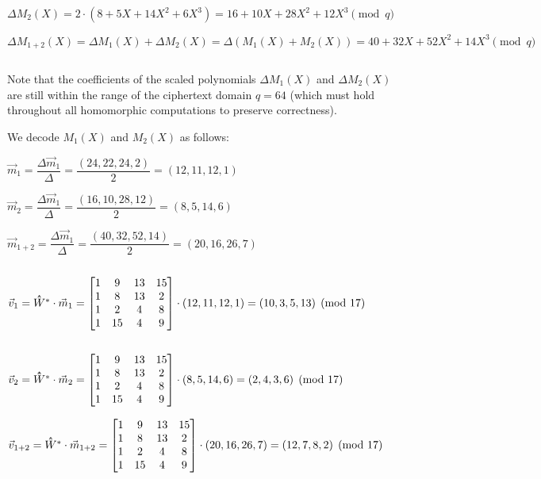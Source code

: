 $\Delta M_2(X) = 2\cdot(8 + 5X + 14X^2 + 6X^3) = 16 + 10X + 28X^2 + 12X^3 \pmod{q}$

$\Delta M_{1+2}(X) = \Delta M_1(X) + \Delta M_2(X) = \Delta (M_1(X) + M_2(X)) = 40 + 32X + 52X^2 + 14X^3 \pmod{q}$

$ $

Note that the coefficients of the scaled polynomials $\Delta M_1(X)$ and $\Delta M_2(X)$ are still within the range of the ciphertext domain $q=64$ (which must hold throughout all homomorphic computations to preserve correctness). 

We decode $M_1(X)$ and $M_2(X)$ as follows: 

$\vec{m}_1 = \dfrac{\Delta \vec{m}_1}{\Delta} = \dfrac{(24, 22, 24, 2)}{2} = (12, 11, 12, 1)$

$\vec{m}_2 = \dfrac{\Delta \vec{m}_1}{\Delta} = \dfrac{(16, 10, 28, 12)}{2} = (8, 5, 14, 6)$

$\vec{m}_{1+2} = \dfrac{\Delta \vec{m}_1}{\Delta} = \dfrac{(40, 32, 52, 14)}{2} = (20, 16, 26, 7)$

$ $


$\vec{v}_1 = \hathat{W}^* \cdot \vec{m}_1 = \begin{bmatrix}
1 & 9 & 13 & 15\\
1 & 8 & 13 & 2\\
1 & 2 & 4 & 8\\
1 & 15 & 4 & 9\\
\end{bmatrix} \cdot (12, 11, 12, 1) = (10, 3, 5, 13) \pmod{17}$

$ $

$\vec{v}_2 = \hathat{W}^* \cdot \vec{m}_2 = \begin{bmatrix}
1 & 9 & 13 & 15\\
1 & 8 & 13 & 2\\
1 & 2 & 4 & 8\\
1 & 15 & 4 & 9\\
\end{bmatrix} \cdot (8, 5, 14, 6) = (2, 4, 3, 6) \pmod{17}$

$\vec{v}_{1+2} = \hathat{W}^* \cdot \vec{m}_{1+2} = \begin{bmatrix}
1 & 9 & 13 & 15\\
1 & 8 & 13 & 2\\
1 & 2 & 4 & 8\\
1 & 15 & 4 & 9\\
\end{bmatrix} \cdot (20, 16, 26, 7) = (12, 7, 8, 2) \pmod{17}$

